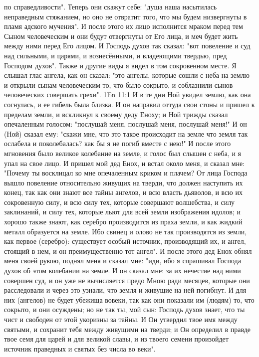по справедливости".
Теперь они скажут себе: "душа наша насытилась неправедным стяжанием,
но оно не отвратит того, что мы будем низвергнуты в пламя адского мучения".
И после этого их лицо исполнится мраком перед тем Сыном человеческим и
они будут отвергнуты от Его лица, и меч будет жить между ними перед Его лицом.
И Господь духов так сказал: "вот повеление и суд над сильными, и
царями, и вознесёнными, и владеющими твердью, пред Господом духов".
Также и другие виды я видел в том сокровенном месте.
Я слышал глас ангела, как он сказал: "это ангелы, которые сошли с неба
на землю и открыли сынам человеческим то, что было сокрыто, и соблазнили сынов
человеческих совершать грехи".
\vs 1En 11:1
И в те дни Ной увидел землю, как она согнулась, и ее гибель была
близка.
И он направил оттуда свои стоны и пришел к пределам земли, и вскликнул
к своему деду Еноху; и Ной трижды сказал опечаленным голосом: "послушай меня,
послушай меня, послушай меня!"
И он (Ной) сказал ему: "скажи мне, что это такое происходит на земле
что земля так ослабела и поколебалась?
как бы я не погиб вместе с нею!"
И после этого мгновения было великое колебание на земле, и голос был
слышен с неба, и я упал на свое лицо.
И пришел мой дед Енох, и встал около меня, и сказал мне: "Почему ты
восклицал ко мне опечаленным криком и плачем?
От лица Господа вышло повеление относительно живущих на тверди, что
должен наступить их конец, так как они знают все тайны ангелов, и всю власть
дьяволов, и всю их сокровенную силу, и всю силу тех, которые совершают
волшебства, и силу заклинаний, и силу тех, которые льют для всей земли
изображения идолов; и хорошо также знают, как серебро производится из праха
земли, и как жидкий металл образуется на земле.
Ибо свинец и олово не так производятся из земли, как первое (серебро):
существует особый источник, производящий их, и ангел, стоящий в нем, и он
преимущественно тот ангел".
И после этого дед Енох обнял меня своей рукою, поднял меня и сказал
мне: "иди, ибо я спрашивал Господа духов об этом колебании на земле.
И он сказал мне: за их нечестие над ними совершен суд, и он уже не
вычисляется предо Мною ради месяцев, которые они расследовали и через это
узнали, что земля и живущие на ней погибнут.
И для них (ангелов) не будет убежища вовеки, так как они показали им
(людям) то, что сокрыто, и они осуждены; но не так ты, мой сын: Господь духов
знает, что ты чист и свободен от этой укоризны за тайны.
И Он утвердил твое имя между святыми, и сохранит тебя между живущими
на тверди; и Он определил в правде твое семя для царей и для великой славы, и
из твоего семени произойдет источник праведных и святых без числа во веки".
